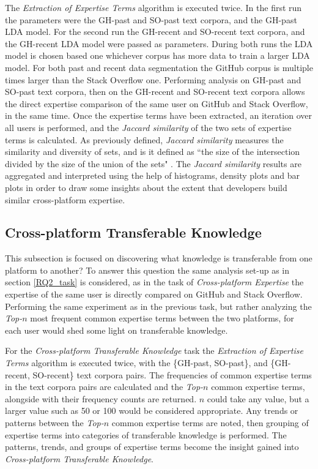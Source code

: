         The \emph{Extraction of Expertise Terms} algorithm is executed twice. In the first run the parameters were the GH-past and SO-past text corpora, and the GH-past LDA model. For the second run the GH-recent and SO-recent text corpora, and the GH-recent LDA model were passed as parameters. During both runs the LDA model is chosen based one whichever corpus has more data to train a larger LDA model. For both past and recent data segmentation the GitHub corpus is multiple times larger than the Stack Overflow one. Performing analysis on GH-past and SO-past text corpora, then on the GH-recent and SO-recent text corpora allows the direct expertise comparison of the same user on GitHub and Stack Overflow, in the same time. Once the expertise terms have been extracted, an iteration over all users is performed, and the \emph{Jaccard similarity} of the two sets of expertise terms is calculated. As previously defined, \emph{Jaccard similarity} measures the similarity and diversity of sets, and is it defined as ``the size of the intersection divided by the size of the union of the sets" \cite{jaccard_wiki}. The \emph{Jaccard similarity} results are aggregated and interpreted using the help of histograms, density plots and bar plots in order to draw some insights about the extent that developers build similar cross-platform expertise.
    
    \subsection{Cross-platform Transferable Knowledge\label{RQ3_task}}
        This subsection is focused on discovering what knowledge is transferable from one platform to another? To answer this question the same analysis set-up as in section \ref{RQ2_task} is considered, as in the task of \emph{Cross-platform Expertise} the expertise of the same user is directly compared on GitHub and Stack Overflow. Performing the same experiment as in the previous task, but rather analyzing the \emph{Top-$n$} most frequent common expertise terms between the two platforms, for each user would shed some light on transferable knowledge.
        
        For the \emph{Cross-platform Transferable Knowledge} task the \emph{Extraction of Expertise Terms} algorithm is executed twice, with the \{GH-past, SO-past\}, and \{GH-recent, SO-recent\} text corpora pairs. The frequencies of common expertise terms in the text corpora pairs are calculated and the \emph{Top-$n$} common expertise terms, alongside with their frequency counts are returned. $n$ could take any value, but a larger value such as 50 or 100 would be considered appropriate. Any trends or patterns between the \emph{Top-$n$} common expertise terms are noted, then grouping of expertise terms into categories of transferable knowledge is performed. The patterns, trends, and groups of expertise terms become the insight gained into \emph{Cross-platform Transferable Knowledge}.
        
